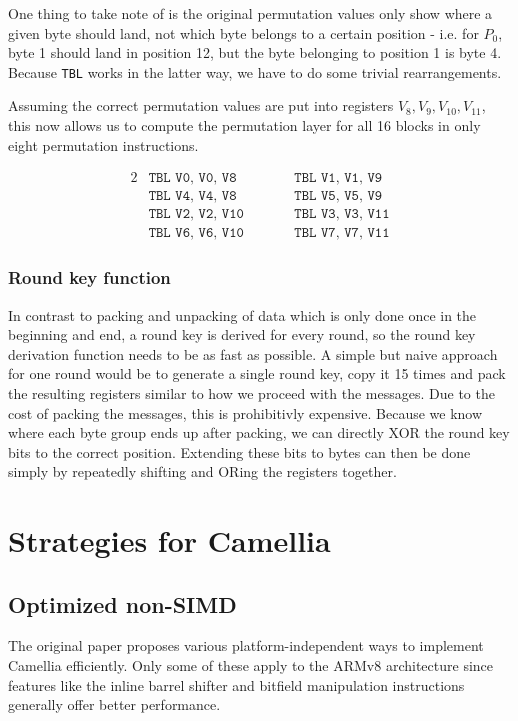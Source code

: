 One thing to take note of is the original permutation values only show where a
given byte should land, not which byte belongs to a certain position - i.e. for
$P_0$, byte 1 should land in position 12, but the byte belonging to position 1
is byte 4. Because \texttt{TBL} works in the latter way, we have to do some
trivial rearrangements.

Assuming the correct permutation values are put into registers
$V_8,V_9,V_{10},V_{11}$, this now allows us to compute the permutation layer
for all 16 blocks in only eight permutation instructions.

\begin{alignat*}{2}
    &\texttt{TBL V0, V0, V8}\qquad &&\texttt{TBL V1, V1, V9} \\
    &\texttt{TBL V4, V4, V8}\qquad &&\texttt{TBL V5, V5, V9} \\
    &\texttt{TBL V2, V2, V10}\qquad &&\texttt{TBL V3, V3, V11} \\
    &\texttt{TBL V6, V6, V10}\qquad &&\texttt{TBL V7, V7, V11}
\end{alignat*}

\subsubsection{Round key function}

In contrast to packing and unpacking of data which is only done once in the
beginning and end, a round key is derived for every round, so the round key
derivation function needs to be as fast as possible. A simple but naive
approach for one round would be to generate a single round key, copy it 15
times and pack the resulting registers similar to how we proceed with the
messages. Due to the cost of packing the messages, this is prohibitivly
expensive. Because we know where each byte group ends up after packing, we can
directly XOR the round key bits to the correct position. Extending these bits
to bytes can then be done simply by repeatedly shifting and ORing the registers
together.

\section{Strategies for Camellia}

\subsection{Optimized non-SIMD}

The original paper proposes various platform-independent ways to implement
Camellia efficiently. Only some of these apply to the ARMv8 architecture since
features like the inline barrel shifter and bitfield manipulation instructions
generally offer better performance.

